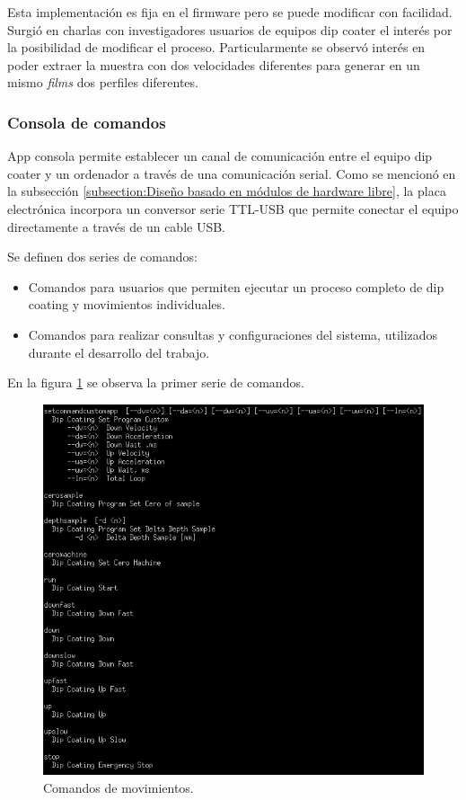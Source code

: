 Esta implementación es fija en el firmware pero se puede modificar con facilidad. Surgió en charlas con investigadores usuarios de equipos dip coater el interés por la posibilidad de modificar el proceso. Particularmente se observó interés en poder extraer la muestra con dos velocidades diferentes para generar en un mismo \textit{films} dos perfiles diferentes.


\subsubsection{Consola de comandos}
\label{sec:consola_comandos}

App consola permite establecer un canal de comunicación entre el equipo dip coater y un ordenador a través de una comunicación serial. Como se mencionó en la subsección \ref{subsection:Diseño basado en módulos de hardware libre}, la placa electrónica incorpora un conversor serie TTL-USB que permite conectar el  equipo directamente a través de un cable USB. 

Se definen dos series de comandos:
\begin{itemize}
\item Comandos para usuarios que permiten ejecutar un proceso completo de dip coating y movimientos individuales.
\item Comandos para realizar consultas y configuraciones del sistema, utilizados durante el desarrollo del trabajo.
\end{itemize}

En la figura \ref{fig:consola_movimientos} se observa la primer serie de comandos. 
\begin{figure}[h!]
	\centering
	\includegraphics[width=1\textwidth]{./Figures/consola_2.png}
	\caption{Comandos de movimientos.}
	\label{fig:consola_movimientos}
\end{figure}



